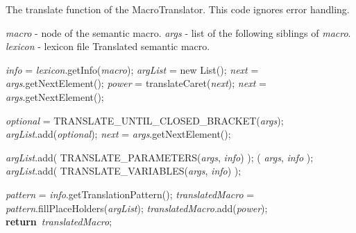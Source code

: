 \documentclass[a4paper,11pt]{article}
\newcommand{\NULL}{\textbf{null}}
\renewcommand{\Return}{\textbf{return}}
\theoremstyle{defTheoStyle}
\theoremstyle{defExampStyle}
\begin{document}
	\begin{algorithm}[!ht]
		\caption{The translate function of the MacroTranslator. This code ignores error handling.}\label{alg:macro-translation}
		\begin{algorithmic}[1]
			\Require 
			\Statex \textit{macro} - node of the semantic macro. 
			\Statex \textit{args} - list of the following siblings of \textit{macro}. 
			\Statex \textit{lexicon} - lexicon file
			\Ensure 
			\Statex Translated semantic macro.
			
			\State \textit{info} = \textit{lexicon}.getInfo(\textit{macro});\label{line:get_info}
			\State \textit{argList} = new List(); 
			\State \textit{next} = \textit{args}.getNextElement();
			\label{line:next_caret}
			\State \textit{power} = translateCaret(\textit{next});
			\State \textit{next} = \textit{args}.getNextElement();
			\EndIf
			
			\While{\textit{next} is $[$}\label{line:next_optional} 
			\State \textit{optional} = {\scriptsize TRANSLATE\_UNTIL\_CLOSED\_BRACKET}(\textit{args});
			\State \textit{argList}.add(\textit{optional});
			\State \textit{next} = \textit{args}.getNextElement();
			\EndWhile
			
			\State \textit{argList}.add( {\scriptsize TRANSLATE\_PARAMETERS}(\textit{args}, \textit{info}) ); \label{line:trans_paras} 
			( \textit{args}, \textit{info} );  \label{line:skip_ats} 
			\State \textit{argList}.add( {\scriptsize TRANSLATE\_VARIABLES}(\textit{args}, \textit{info}) ); \label{line:trans_vars} 
			
			\State \textit{pattern} = \textit{info}.getTranslationPattern();
			\State \textit{translatedMacro} = \textit{pattern}.fillPlaceHolders(\textit{argList});\label{line:fill_pattern}
			\If{\textit{power} is not \NULL}\label{line:shifted_exp}
			\State \textit{translatedMacro}.add(\textit{power});
			\EndIf
			\State \Return\ \textit{translatedMacro};
			\EndProcedure
		\end{algorithmic}
	\end{algorithm}
	
\end{document}
